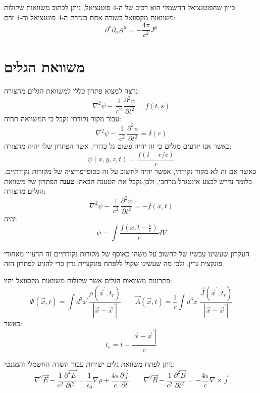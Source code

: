 \documentclass{tstextbook}
\begin{document}
\begin{remark}
כיוון שהפוטנציאל החשמלי הוא רכיב של ה-4 פוטנציאל, ניתן לכתוב משוואות שקולות משוואות מקסוואל בשורה אחת בעזרת ה-4 פוטנציאל וה-4 זרם:
$$\partial^{\nu}\partial_\nu A^{\mu}=-\frac{4\pi}{c^{2}}J^{\mu}$$

\end{remark}
\section{משוואת הגלים}

נרצה למצוא פתרון כללי למשוואת הגלים מהצורה:
$$\nabla^{2}\psi-\,{\frac{1}{c^{2}}}\,{\frac{\partial^{2}\psi}{\partial t^{2}}}=f(t,s)$$
עבור מקור נקודתי נקבל כי המשוואה תהיה:
$$\nabla^{2}\psi-\,{\frac{1}{c^{2}}}\,{\frac{\partial^{2}\psi}{\partial t^{2}}}=\delta(r)$$
כאשר אנו יודעים מגלים כי זה יהיה פשוט גל כדורי, אשר הפתרון שלו יהיה מהצורה:
$$\psi(x,y,z,t)={\frac{f(t-r/c)}{r}}$$
כאשר אם זה לא מקור נקודתי, אפשר יהיה לחשוב על זה כסופרפוזיציה של מקורות נקודתיים. כלומר נדרש לבצע אינטגרל מרחבי, 
ולכן נקבל את הטענה הבאה:
\textbf{טענה}
הפתרון של משוואת הגלים מהצורה:
$$\nabla^{2}\psi-\,{\frac{1}{c^{2}}}\,{\frac{\partial^{2}\psi}{\partial t^{2}}}=-f(x,t)$$
יהיה:
$$\psi=\int \frac{f\left(x, t-\frac{r}{c} \right)}{r}dV$$

\begin{remark}
העקרון שעשינו עכשיו של לחשוב על משהו כאוסף של מקורות נקודתיים זה הרעיון מאחורי פונקצית גרין. ולכן מה שעשינו שקול ללפתח פונקציית גרין כדי להגיע לפתרון הזה.

\end{remark}
\begin{corollary}
פתרונות משוואות הגלים אשר שקולות משוואות מקסוואל יהיו:
$$\Phi(\vec{x},t)=\int d^{3}x^{\prime}\frac{\rho(\vec{x}^{\prime},t_{r})}{|\vec{x}-\vec{x}^{\prime}|} \qquad \vec{A}(\vec{x},t)=\frac{1}{c}\int d^{3}x^{\prime}\frac{\vec{J}(\vec{x}^{\prime},t_{r})}{|\vec{x}-\vec{x}^{\prime}|} $$
כאשר:
$$t_{r}=t-{\frac{|{\vec{x}}-{\vec{x}}^{\prime}|}{c}}$$

\end{corollary}
\begin{proposition}
ניתן לפתח משוואת גלים ישירות עבור השדה החשמלי והמגנטי:
$$\nabla^{2}\vec{E}-{\frac{1}{c^{2}}}{\frac{\partial^{2}\vec{E}}{\partial t^{2}}}={\frac{1}{\epsilon_{0}}}\nabla\rho+\frac{4\pi}{c}{\frac{\partial\vec{j}}{\partial t}}\qquad \nabla^{2}\vec{B}-{\frac{1}{c^{2}}}{\frac{\partial^{2}\vec{B}}{\partial t^{2}}}=-\frac{4\pi}{c}\nabla\times\vec{j}$$

\end{proposition}
\end{document}
